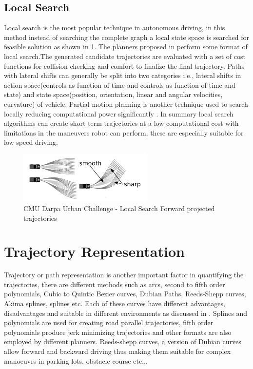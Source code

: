\subsection{Local Search}
\label{rw_local_search}

Local search is the most popular technique in autonomous driving, in this method instead of searching the complete graph a local state space is searched for feasible solution as shown in \ref{cmubossduc}. The planners proposed in \cite{darpa_urban_challenge} \cite{juniorstanford} \cite{kolski_thesis} \cite{Broggi2012} \cite{real_time_traj_plan_article} \cite{urbansafetyeth} perform some format of local search.The generated candidate trajectories are evaluated with a set of cost functions for collision checking and comfort to finalize the final trajectory. Paths with lateral shifts can generally be split into two categories i.e., lateral shifts in action space(controls as function of time and controls as function of time and state) and state space(position, orientation, linear and angular velocities, curvature) of vehicle\cite{howard_phd}. Partial motion planning is another technique used to search locally reducing computational power significantly \cite{partialmotionplanning}. In summary local search algorithms can create short term trajectories at a low computational cost with limitations in the maneuvers robot can perform, these are especially suitable for low speed driving.  

\begin{figure}
	\centering
	\includegraphics[width=0.6\textwidth]{Images/related_work/trajectorysetbossduc.png}
	\caption{CMU Darpa Urban Challenge - Local Search Forward projected trajectories}
	\label{cmubossduc}
\end{figure} 

\section{Trajectory Representation}
\label{trajrep}
Trajectory or path representation is another important factor in quantifying the trajectories, there are different methods such as arcs, second to fifth order polynomials, Cubic to Quintic Bezier curves, Dubian Paths, Reeds-Shepp curves, Akima splines, splines etc. Each of these curves have different advantages, disadvantages and suitable in different environments as discussed in \cite{motion_planning_techniques}. Splines and polynomials are used for creating road parallel trajectories, fifth order polynomials produce jerk minimizing trajectories\cite{werling_frenet} and other formats are also employed by different planners. Reeds-shepp curves, a version of Dubian curves allow forward and backward driving \cite{reedsshepp} thus making them suitable for complex manoeuvrs in parking lots, obstacle course etc.,.



